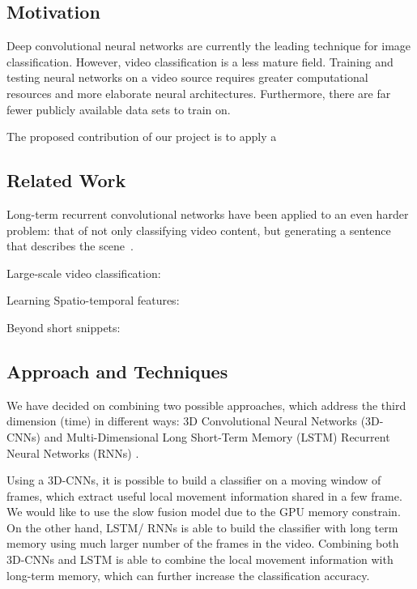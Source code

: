 \subsection*{Motivation}
Deep convolutional neural networks are currently the leading technique for image classification. However, video classification is a less mature field. Training and testing neural networks on a video source requires greater computational resources and more elaborate neural architectures. Furthermore, there are far fewer publicly available data sets to train on. 

The proposed contribution of our project is to apply a 
\subsection*{Related Work}

Long-term recurrent convolutional networks have been applied to an even harder problem: that of not only classifying video content, but generating a sentence that describes the scene~\cite{ltrcn}.

Large-scale video classification:~\cite{cnnvid}

Learning Spatio-temporal features:~\cite{stf}

Beyond short snippets:~\cite{snip}
\subsection*{Approach and Techniques}

We have decided on combining two possible approaches, which address
the third dimension (time) in different ways: 3D Convolutional Neural
Networks (3D-CNNs) \cite{stf,cnnvid} and Multi-Dimensional Long
Short-Term Memory (LSTM) Recurrent Neural Networks (RNNs) \cite{ltrcn}. 

Using a 3D-CNNs, it is possible to build a classifier on a moving window
of frames, which extract useful local movement information shared
in a few frame. We would like to use the slow fusion model \cite{cnnvid}
due to the GPU memory constrain. On the other hand, LSTM/ RNNs is
able to build the classifier with long term memory
using much larger number of the frames in the video. 
Combining both 3D-CNNs and LSTM is able to combine the
local movement information with long-term memory,
which can further increase the classification accuracy.

